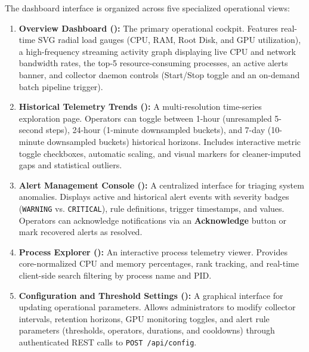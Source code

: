 The dashboard interface is organized across five specialized operational views:
\begin{enumerate}
    \item \textbf{Overview Dashboard ():} The primary operational cockpit. Features real-time SVG radial load gauges (CPU, RAM, Root Disk, and GPU utilization), a high-frequency streaming activity graph displaying live CPU and network bandwidth rates, the top-5 resource-consuming processes, an active alerts banner, and collector daemon controls (Start/Stop toggle and an on-demand batch pipeline trigger).
    \item \textbf{Historical Telemetry Trends ():} A multi-resolution time-series exploration page. Operators can toggle between 1-hour (unresampled 5-second steps), 24-hour (1-minute downsampled buckets), and 7-day (10-minute downsampled buckets) historical horizons. Includes interactive metric toggle checkboxes, automatic scaling, and visual markers for cleaner-imputed gaps and statistical outliers.
    \item \textbf{Alert Management Console ():} A centralized interface for triaging system anomalies. Displays active and historical alert events with severity badges (\texttt{WARNING} vs. \texttt{CRITICAL}), rule definitions, trigger timestamps, and values. Operators can acknowledge notifications via an \textbf{Acknowledge} button or mark recovered alerts as resolved.
    \item \textbf{Process Explorer ():} An interactive process telemetry viewer. Provides core-normalized CPU and memory percentages, rank tracking, and real-time client-side search filtering by process name and PID.
    \item \textbf{Configuration and Threshold Settings ():} A graphical interface for updating operational parameters. Allows administrators to modify collector intervals, retention horizons, GPU monitoring toggles, and alert rule parameters (thresholds, operators, durations, and cooldowns) through authenticated REST calls to \texttt{POST /api/config}.
\end{enumerate}

